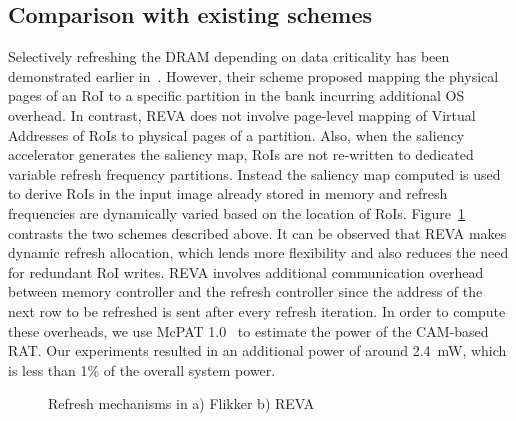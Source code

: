 \subsection{Comparison with existing schemes}
Selectively refreshing the DRAM depending on data criticality has been demonstrated earlier in~\cite{Liu2011}. 
However, their scheme proposed mapping the physical pages of an RoI to a specific partition in the bank incurring additional OS overhead. In contrast, REVA does not involve page-level mapping of Virtual Addresses of RoIs to physical pages of a partition. 
Also, when the saliency accelerator generates the saliency map, RoIs are not re-written to dedicated variable refresh frequency partitions. Instead the saliency map computed is used to derive RoIs in the input image already stored in memory and refresh frequencies are dynamically varied based on the location of RoIs.
Figure~\ref{fig:reva-refresh} contrasts the two schemes described above. It can be observed that REVA makes dynamic refresh allocation, which lends more flexibility and also reduces the need for redundant RoI writes.
REVA involves additional communication overhead between memory controller and the refresh controller since the address of the next row to be refreshed is sent after every refresh iteration. 
In order to compute these overheads, we use McPAT 1.0~\cite{mcpat} to estimate the power of the CAM-based RAT. Our experiments resulted in an additional power of around 2.4~mW, which is less than 1\% of the overall system power.

\begin{figure}[ht!]
\centering
{}
\caption{\label{fig:reva-refresh} Refresh mechanisms in a) Flikker  b) REVA}
\vspace{-0.2in}
\end{figure}
